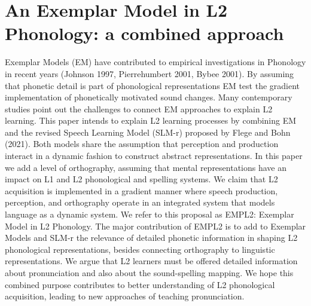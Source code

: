 \chapter{An Exemplar Model in L2 Phonology: a combined approach}\label{ch:danielamarali32}
\begin{affils}
\end{affils}

Exemplar Models (EM) have contributed to empirical investigations in Phonology in recent years (Johnson 1997, Pierrehumbert 2001, Bybee 2001). By assuming that phonetic detail is part of phonological representations EM test the gradient implementation of phonetically motivated sound changes. Many contemporary studies point out the challenges  to connect EM approaches to explain L2 learning. This paper intends to explain L2 learning processes by combining EM and the revised Speech Learning Model (SLM-r) proposed by Flege and Bohn (2021). Both models share the assumption that perception and production interact in a dynamic fashion to construct abstract representations. In this paper we add a level of orthography, assuming that mental representations have an impact on L1 and L2 phonological and spelling systems. We claim that L2 acquisition is implemented in a gradient manner where speech production, perception, and orthography operate in an integrated system that models language as a dynamic system. We refer to this proposal as EMPL2: Exemplar Model in L2 Phonology. The major contribution of EMPL2 is to add to Exemplar Models and SLM-r the relevance of detailed phonetic information in shaping L2 phonological representations, besides connecting orthography to linguistic representations. We argue that L2 learners must be offered detailed information about pronunciation and also about the sound-spelling mapping. We hope this combined purpose contributes to better understanding of L2 phonological acquisition, leading to new approaches of teaching pronunciation.
